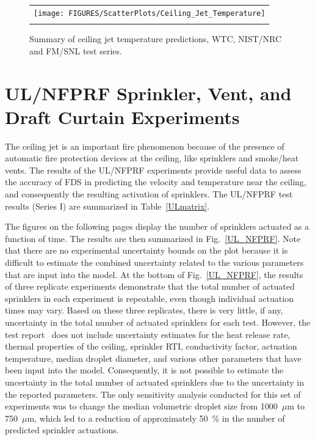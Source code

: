 \begin{figure}[p]
\begin{center}
\begin{tabular}{c}
\texttt{[image: FIGURES/ScatterPlots/Ceiling\_Jet\_Temperature]} \\
\vspace{0.25in}
\end{tabular}
\end{center}
\caption[Summary of ceiling jet temperature predictions, WTC, NIST/NRC and FM/SNL test series.]
{Summary of ceiling jet temperature predictions, WTC, NIST/NRC and FM/SNL test series.}
\end{figure}



\clearpage

\section{UL/NFPRF Sprinkler, Vent, and Draft Curtain Experiments}
\label{UL_NFPRF:Results}

The ceiling jet is an important fire phenomenon because of the presence of automatic fire protection devices at the ceiling, like
sprinklers and smoke/heat vents. The results of the UL/NFPRF experiments provide useful data to assess the accuracy of FDS in predicting
the velocity and temperature near the ceiling, and consequently the resulting activation of sprinklers.
The UL/NFPRF test results (Series I) are summarized in Table~\ref{ULmatrix}.

The figures on the following pages display the number of sprinklers actuated as a function of time.
The results are then summarized in Fig.~\ref{UL_NFPRF}. Note that there are no experimental uncertainty bounds on the plot because it is difficult to estimate the
combined uncertainty related to the various parameters that are input into the model. At the bottom of Fig.~\ref{UL_NFPRF}, the results of three replicate experiments
demonstrate that the total number of actuated sprinklers in each experiment is repeatable, even though individual actuation times may vary. Based on these
three replicates, there is very little, if any, uncertainty in the total number of actuated sprinklers for each test. However, the test report~\cite{Sheppard:1} does not
include uncertainty estimates for the heat release rate, thermal properties of the ceiling, sprinkler RTI, conductivity factor, actuation temperature,
median droplet diameter, and various other parameters that have been input into the model. Consequently, it is not possible to estimate the uncertainty in the
total number of actuated sprinklers due to the uncertainty in the reported parameters. The only sensitivity analysis conducted for this set of experiments was
to change the median volumetric droplet size from 1000~$\mu$m to 750~$\mu$m, which led to a reduction of approximately 50~\% in the number of predicted sprinkler actuations.


